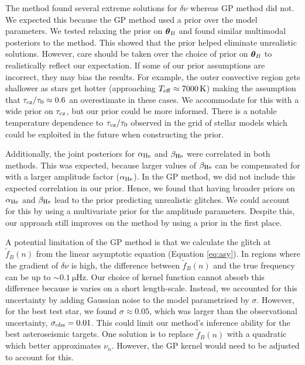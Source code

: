 
The  method found several extreme solutions for \(\delta\nu\) whereas GP method did not. We expected this because the GP method used a prior over the model parameters. We tested relaxing the prior on \(\bm{\theta}_B\) and found similar multimodal posteriors to the  method. This showed that the prior helped eliminate unrealistic solutions. However, care should be taken over the choice of prior on \(\bm{\theta}_B\) to realistically reflect our expectation. If some of our prior assumptions are incorrect, they may bias the results. For example, the outer convective region gets shallower as stars get hotter (approaching \({T_\mathrm{eff}} \approx \SI{7000}{\kelvin}\)) making the assumption that \(\tau_{{\mathrm{cz}}}/\tau_0 \approx 0.6\) an overestimate in these cases. We accommodate for this with a wide prior on \(\tau_{{\mathrm{cz}}}\), but our prior could be more informed. There is a notable temperature dependence to \(\tau_{{\mathrm{cz}}}/\tau_0\) observed in the grid of stellar models which could be exploited in the future when constructing the prior.

Additionally, the joint posteriors for \(\alpha_{{\mathrm{He}}}\) and \(\beta_{{\mathrm{He}}}\) were correlated in both methods. This was expected, because larger values of \(\beta_{{\mathrm{He}}}\) can be compensated for with a larger amplitude factor (\(\alpha_{{\mathrm{He}}}\)). In the GP method, we did not include this expected correlation in our prior. Hence, we found that having broader priors on \(\alpha_{{\mathrm{He}}}\) and \(\beta_{{\mathrm{He}}}\) lead to the prior predicting unrealistic glitches. We could account for this by using a multivariate prior for the amplitude parameters. Despite this, our approach still improves on the  method by using a prior in the first place.

A potential limitation of the GP method is that we calculate the glitch at \(\tilde{f}_B(n)\) from the linear asymptotic equation (Equation \ref{eq:asy}). In regions where the gradient of \(\delta\nu\) is high, the difference between \(\tilde{f}_B(n)\) and the true frequency can be up to \(\sim \SI{0.1}{\micro\hertz}\). Our choice of kernel function cannot absorb this difference because is varies on a short length-scale. Instead, we accounted for this uncertainty by adding Gaussian noise to the model parametrised by \(\sigma\). However, for the best test star, we found \(\sigma \approx 0.05\), which was larger than the observational uncertainty, \(\sigma_{{\mathrm{obs}}} = 0.01\). This could limit our method's inference ability for the best asteroseismic targets. One solution is to replace \(\tilde{f}_B(n)\) with a quadratic \citep[e.g.][]{Nielsen.Davies.ea2021} which better approximates \(\nu_n\). However, the GP kernel would need to be adjusted to account for this.

